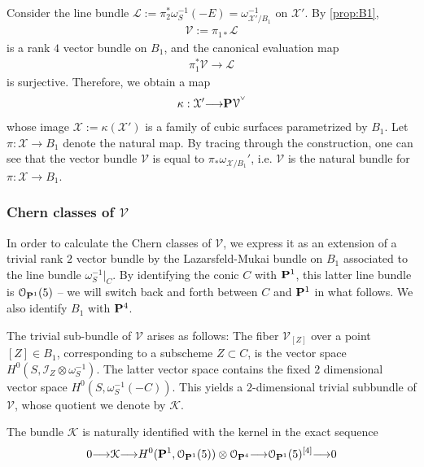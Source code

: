 \documentclass[12pt,reqno]{amsart}
\renewcommand{\to}{{\longrightarrow}}
\numberwithin{equation}{section}
\renewcommand{\O}{\mathcal O}
\newcommand{\V}{\mathcal V}
\newcommand{\cX}{\mathcal{X}}
\newcommand{\smvee}{\raise0.5ex\hbox{$\scriptscriptstyle\vee$}}
\begin{document}
Consider the line bundle
$\mathcal{L} := \pi_{2}^{*}\omega_{S}^{-1} (-E) =
\omega_{\cX'/B_{1}}^{-1}$ on $\cX'$.  By \autoref{prop:B1},
\begin{align}
  \label{eq:V1}
  \V := \pi_{1 *}\mathcal{L}
\end{align}
is a rank $4$ vector bundle on $B_1$, and the canonical evaluation map
\begin{align}
  \label{eq:eval1}
  \pi_{1}^{*}\V \to \mathcal{L}
\end{align}
is surjective.  Therefore, we obtain a map
\begin{align}
  \label{eq:X11}
  \kappa: \cX' \to \P \V^{\smvee}
\end{align}
whose image $\cX := \kappa(\cX')$ is a family of cubic surfaces
parametrized by $B_1$.  Let $\pi: \cX \to B_1$ denote the natural map.
By tracing through the construction, one can see that the vector
bundle $\V$ is equal to $\pi_{*} \omega_{\cX/B_1}'$, i.e. $\V$ is the
natural bundle for $\pi: \cX \to B_1$.

\subsubsection{Chern classes of $\V$}
\label{sec:chern-classes-b_1}

In order to calculate the Chern classes of $\V$, we express it as an
extension of a trivial rank $2$ vector bundle by the Lazarsfeld-Mukai
bundle on $B_1$ associated to the line bundle
$\omega_{S}^{-1}|_{C}$. By identifying the conic $C$ with $\P^{1}$,
this latter line bundle is $\O_{\P^{1}}(5)$ -- we will switch back and
forth between $C$ and $\P^{1}$ in what follows.  We also identify
$B_{1}$ with $\P^{4}$.


The trivial sub-bundle of $\V$ arises as follows: The fiber $\V_{[Z]}$
over a point $[Z] \in B_1$, corresponding to a subscheme
$Z \subset C$, is the vector space
$H^{0}(S, \mathcal{I}_{Z} \otimes \omega_{S}^{-1})$.  The latter
vector space contains the fixed $2$ dimensional vector space
$H^{0}(S, \omega_{S}^{-1}(-C))$.  This yields a $2$-dimensional
trivial subbundle of $\V$, whose quotient we denote by $\mathcal{K}$.


The bundle $\mathcal{K}$ is naturally identified with the kernel in
the exact sequence
\begin{align}
  \label{eq:LM}
  0 \to \mathcal{K} \to H^{0}(\P^1, \O_{\P^{1}}(5)) \otimes \O_{\P^4} \to \O_{\P^{1}}(5)^{[4]} \to 0 
\end{align}
\end{document}
